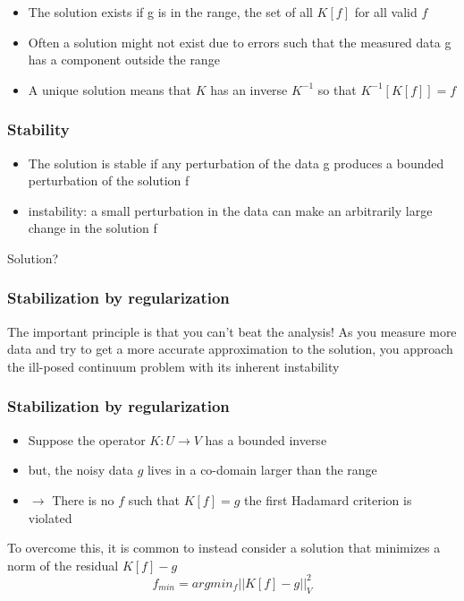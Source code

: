 \documentclass{beamer}
\begin{document}
\begin{frame}
	\begin{itemize}
          \item	The solution exists if g is in the range, the set of all $K[f]$ for all valid $f$
		 \pause
	  \item Often a solution might not exist due to errors such that the measured data g has a component
outside the range
		 \pause
\item A unique solution means that $K$ has an inverse $K^{-1}$ so that $K^{-1}[K[f]] = f $
	\end{itemize}
\end{frame}
\begin{frame}
	\frametitle{Stability}
	\begin{itemize}
		\item The solution is \colorbox{green!30}{stable} if \colorbox{green!30}{any perturbation of the data} g produces a \colorbox{green!30}{bounded perturbation of the solution f}
		 \pause
		\item \colorbox{red!30}{instability: } a small \colorbox{red!30}{perturbation in the data} can make an arbitrarily \colorbox{red!30}{large change in the solution f}
	\end{itemize}
\end{frame}
\begin{frame}
\center
Solution?
\end{frame}
\begin{frame}
	\frametitle{Stabilization by regularization}
	\center The important principle is that you can’t
beat the analysis!
\newline
As you measure more data and try to get a more accurate approximation to the solution, you approach the ill-posed continuum problem
with its inherent instability
\end{frame}

\begin{frame}
	\frametitle{Stabilization by regularization}
	\begin{itemize}
		\item Suppose the operator $K : U \rightarrow V  $ has a bounded inverse
		\item but, the noisy data $g$ lives in a co-domain larger than the range
		\item $\rightarrow$ There is no $f$ such that $ K[f] = g$ the first Hadamard criterion is violated 
		
	\end{itemize}
		 \pause
	To overcome this, it is common to instead consider a solution that minimizes a norm of the residual $K[f] - g$ 
	$$ f_{min} = argmin_{f} || K[f] - g ||_{V}^{2} $$
\end{frame}
\end{document}
